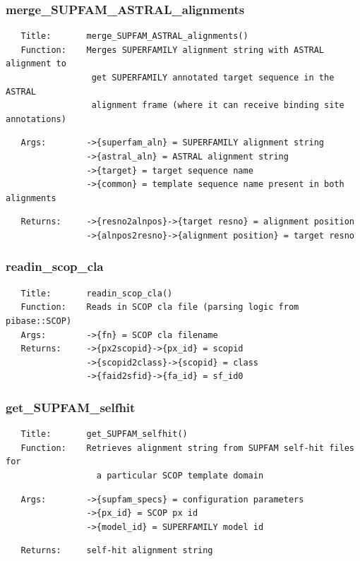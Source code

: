 \documentclass{article}
\begin{document}
\subsubsection*{merge\_SUPFAM\_ASTRAL\_alignments\label{pibase::SUPFAM_pm_merge_SUPFAM_ASTRAL_alignments}}
\begin{verbatim}
   Title:       merge_SUPFAM_ASTRAL_alignments()
   Function:    Merges SUPERFAMILY alignment string with ASTRAL alignment to
                 get SUPERFAMILY annotated target sequence in the ASTRAL
                 alignment frame (where it can receive binding site annotations)
\end{verbatim}
\begin{verbatim}
   Args:        ->{superfam_aln} = SUPERFAMILY alignment string
                ->{astral_aln} = ASTRAL alignment string
                ->{target} = target sequence name
                ->{common} = template sequence name present in both alignments
\end{verbatim}
\begin{verbatim}
   Returns:     ->{resno2alnpos}->{target resno} = alignment position
                ->{alnpos2resno}->{alignment position} = target resno
\end{verbatim}
\subsubsection*{readin\_scop\_cla\label{pibase::SUPFAM_pm_readin_scop_cla}}
\begin{verbatim}
   Title:       readin_scop_cla()
   Function:    Reads in SCOP cla file (parsing logic from pibase::SCOP)
   Args:        ->{fn} = SCOP cla filename
   Returns:     ->{px2scopid}->{px_id} = scopid
                ->{scopid2class}->{scopid} = class
                ->{faid2sfid}->{fa_id} = sf_id0
\end{verbatim}
\subsubsection*{get\_SUPFAM\_selfhit\label{pibase::SUPFAM_pm_get_SUPFAM_selfhit}}
\begin{verbatim}
   Title:       get_SUPFAM_selfhit()
   Function:    Retrieves alignment string from SUPFAM self-hit files for
                  a particular SCOP template domain
\end{verbatim}
\begin{verbatim}
   Args:        ->{supfam_specs} = configuration parameters
                ->{px_id} = SCOP px id
                ->{model_id} = SUPERFAMILY model id
\end{verbatim}
\begin{verbatim}
   Returns:     self-hit alignment string
\end{verbatim}
\end{document}
